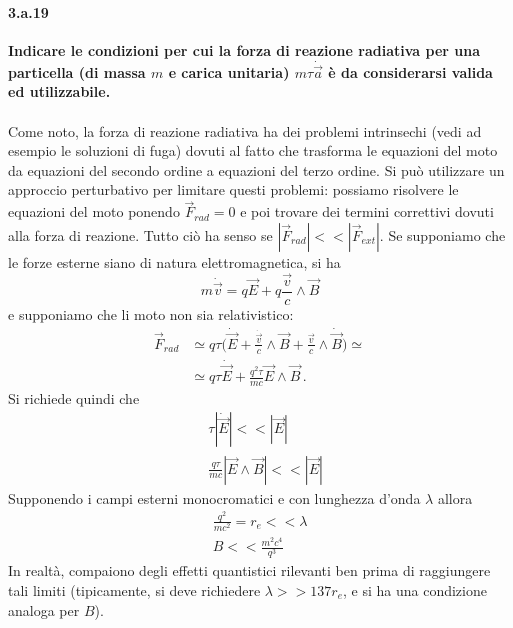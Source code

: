 \documentclass[twoside]{article}
\begin{document}
\paragraph{3.a.19}\textbf{Indicare le condizioni per cui la forza di reazione radiativa per una particella (di massa $m$ e carica unitaria) $m\tau\dot{\vec{a}}$ è da considerarsi valida ed utilizzabile.}\\
\\
Come noto, la forza di reazione radiativa ha dei problemi intrinsechi (vedi ad esempio le soluzioni di fuga) dovuti al fatto che trasforma le equazioni del moto da equazioni del secondo ordine a equazioni del terzo ordine. Si può utilizzare un approccio perturbativo per limitare questi problemi:
possiamo risolvere le equazioni del moto ponendo $\vec{F}_{rad} = 0$ e poi trovare dei termini correttivi dovuti alla forza di reazione. Tutto ciò ha senso se $|\vec{F}_{rad}|<< |\vec{F}_{ext}|$. Se supponiamo che le forze esterne siano di natura elettromagnetica, si ha
\begin{equation}
    m\dot{\vec{v}}=q\vec{E}+q\frac{\vec{v}}{c}\wedge\vec{B}
\end{equation}
e supponiamo che li moto non sia relativistico:
\begin{align}
    \vec{F}_{rad}&\simeq q\tau\biggl(\dot{\vec{E}}+\frac{\dot{\vec{v}}}{c}\wedge\vec{B}+\frac{\vec{v}}{c}\wedge\dot{\vec{B}}\biggr)\simeq\\
    &\simeq q\tau\dot{\vec{E}}+\frac{q^2\tau}{mc}\vec{E}\wedge\vec{B}\,.
\end{align}
Si richiede quindi che 
\begin{align}
    &\tau|\dot{\vec{E}}|<<|\vec{E}|\\
    &\frac{q\tau}{mc}|\vec{E}\wedge\vec{B}|<<|\vec{E}|
\end{align}
Supponendo i campi esterni monocromatici e con lunghezza d'onda $\lambda$ allora
\begin{align}
    \frac{q^2}{mc^2}=r_e<<\lambda\\
    B<<\frac{m^2c^4}{q^3}
\end{align}
In realtà, compaiono degli effetti quantistici rilevanti ben prima di raggiungere tali limiti (tipicamente, si deve
richiedere $\lambda>>137r_e$, e si ha una condizione analoga per $B$).
\end{document}
